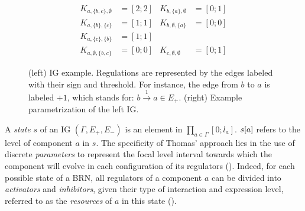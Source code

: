 \begin{figure}[t]
\begin{minipage}{0.4\linewidth}
\centering
{}
\end{minipage}
\begin{minipage}{0.6\linewidth}
\centering
\begin{align*}
K_{a,\{b,c\},\emptyset} &= [2 ; 2] & K_{b,\{a\},\emptyset} &= [0 ; 1] \\
K_{a,\{b\},\{c\}} &= [1 ; 1] & K_{b,\emptyset,\{a\}} &= [0 ; 0] \\
K_{a,\{c\},\{b\}} &= [1 ; 1] &&\\
K_{a,\emptyset,\{b,c\}} &= [0 ; 0] & K_{c,\emptyset,\emptyset} &= [0 ; 1]
\end{align*}
\end{minipage}
\caption{\label{fig:runningBRN}
(left)
IG example.
Regulations are represented by the edges labeled with their sign and threshold.
For instance, the edge from $b$ to $a$ is labeled $+1$, which stands for: $b \xrightarrow{1} a \in
E_+$.
(right)
Example parametrization of the left IG.
}
\end{figure}

A \emph{state} $s$ of an IG $(\Gamma, E_+, E_-)$ is an element in $\prod_{a \in \Gamma} [0;l_a]$.
${s[a]}$ refers to the level of component $a$ in $s$.
The specificity of Thomas' approach lies in the use of discrete \emph{parameters} to represent the
focal level interval towards which the component will evolve in each configuration of its regulators
().
Indeed, for each possible state of a BRN, all regulators of a component $a$ can be divided into
\emph{activators} and \emph{inhibitors}, given their type of interaction and expression level,
referred to as the \emph{resources} of $a$ in this state ().


